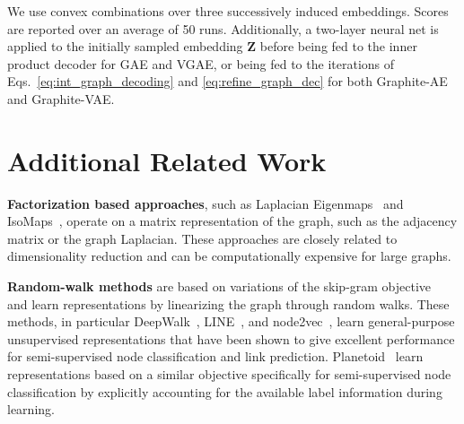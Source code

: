 \documentclass{article}
\begin{document}
We use convex combinations over three successively induced embeddings.  Scores are reported over an average of 50 runs.  Additionally, a two-layer neural net is applied to the initially sampled embedding $\mathbf{Z}$ before being fed to the inner product decoder for GAE and VGAE, or being fed to the iterations of Eqs.~\eqref{eq:int_graph_decoding} and \eqref{eq:refine_graph_dec} for both Graphite-AE and Graphite-VAE.


  \section{Additional Related Work}\label{app:related}
  \textbf{Factorization based approaches}, such as Laplacian Eigenmaps~\citep{belkin2002laplacian} and IsoMaps~\citep{saxena2004non}, operate on a matrix representation of the graph, such as the adjacency matrix or the graph Laplacian. These approaches are closely related to dimensionality reduction and can be computationally expensive for large graphs. 

\textbf{Random-walk methods} are based on variations of the skip-gram objective~\citep{mikolov2013distributed} and learn representations by linearizing the graph through random walks. These methods, in particular DeepWalk~\citep{perozzi2014deepwalk}, LINE~\citep{tang2015line}, and node2vec~\citep{grover2016node2vec}, learn general-purpose unsupervised representations that have been shown to give excellent performance for  semi-supervised node classification and link prediction. Planetoid~\citep{yang2016embeddings} learn representations based on a similar objective specifically for semi-supervised node classification by explicitly accounting for the available label information during learning.
 
\end{document}
